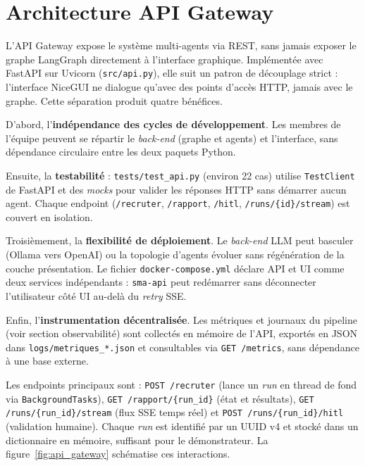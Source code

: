 
\section{Architecture API Gateway}

L'API Gateway expose le système multi-agents via REST, sans jamais exposer le graphe LangGraph directement à l'interface graphique. Implémentée avec FastAPI sur Uvicorn (\texttt{src/api.py}), elle suit un patron de découplage strict : l'interface NiceGUI ne dialogue qu'avec des points d'accès HTTP, jamais avec le graphe. Cette séparation produit quatre bénéfices.

D'abord, l'\textbf{indépendance des cycles de développement}. Les membres de l'équipe peuvent se répartir le \textit{back-end} (graphe et agents) et l'interface, sans dépendance circulaire entre les deux paquets Python.

Ensuite, la \textbf{testabilité} : \texttt{tests/test\_api.py} (environ 22 cas) utilise \texttt{TestClient} de FastAPI et des \textit{mocks} pour valider les réponses HTTP sans démarrer aucun agent. Chaque endpoint (\texttt{/recruter}, \texttt{/rapport}, \texttt{/hitl}, \texttt{/runs/\{id\}/stream}) est couvert en isolation.

Troisièmement, la \textbf{flexibilité de déploiement}. Le \textit{back-end} LLM peut basculer (Ollama vers OpenAI) ou la topologie d'agents évoluer sans régénération de la couche présentation. Le fichier \texttt{docker-compose.yml} déclare API et UI comme deux services indépendants : \texttt{sma-api} peut redémarrer sans déconnecter l'utilisateur côté UI au-delà du \textit{retry} SSE.

Enfin, l'\textbf{instrumentation décentralisée}. Les métriques et journaux du pipeline (voir section observabilité) sont collectés en mémoire de l'API, exportés en JSON dans \texttt{logs/metriques\_*.json} et consultables via \texttt{GET /metrics}, sans dépendance à une base externe.

Les endpoints principaux sont : \texttt{POST /recruter} (lance un \textit{run} en thread de fond via \texttt{BackgroundTasks}), \texttt{GET /rapport/\{run\_id\}} (état et résultats), \texttt{GET /runs/\{run\_id\}/stream} (flux SSE temps réel) et \texttt{POST /runs/\{run\_id\}/hitl} (validation humaine). Chaque \textit{run} est identifié par un UUID v4 et stocké dans un dictionnaire en mémoire, suffisant pour le démonstrateur. La figure~\ref{fig:api_gateway} schématise ces interactions.

